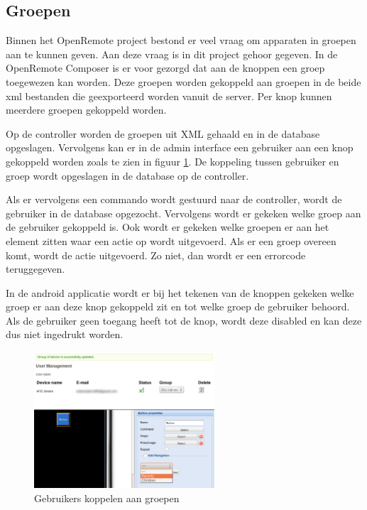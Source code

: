 \documentclass[]{article}
\begin{document}
\subsection{Groepen}
Binnen het OpenRemote project bestond er veel vraag om apparaten in groepen aan
te kunnen geven. Aan deze vraag is in dit project gehoor gegeven. In de
OpenRemote Composer is er voor gezorgd dat aan de knoppen een groep toegewezen
kan worden. Deze groepen worden gekoppeld aan groepen in de beide xml bestanden
die geexporteerd worden vanuit de server. Per knop kunnen meerdere groepen
gekoppeld worden.

Op de controller worden de groepen uit XML gehaald en in de database opgeslagen.
Vervolgens kan er in de admin interface een gebruiker aan een knop gekoppeld
worden zoals te zien in figuur \ref{usergroups}. De koppeling tussen gebruiker
en groep wordt opgeslagen in de database op de controller. 

Als er vervolgens een commando wordt gestuurd naar de controller, wordt de
gebruiker in de database opgezocht. Vervolgens wordt er gekeken welke groep aan
de gebruiker gekoppeld is. Ook wordt er gekeken welke groepen er aan het element
zitten waar een actie op wordt uitgevoerd. Als er een groep overeen komt, wordt
de actie uitgevoerd. Zo niet, dan wordt er een errorcode teruggegeven.

In de android applicatie wordt er bij het tekenen van de knoppen gekeken welke
groep er aan deze knop gekoppeld zit en tot welke groep de gebruiker behoord.
Als de gebruiker geen toegang heeft tot de knop, wordt deze disabled en kan deze
dus niet ingedrukt worden.

\begin{figure}[htpb]
   \begin{center}
     \includegraphics[width=0.6\textwidth]{usergroups.pdf}
   \end{center}
   \caption{Gebruikers koppelen aan groepen}
   \label{usergroups}
\end{figure}
\end{document}
